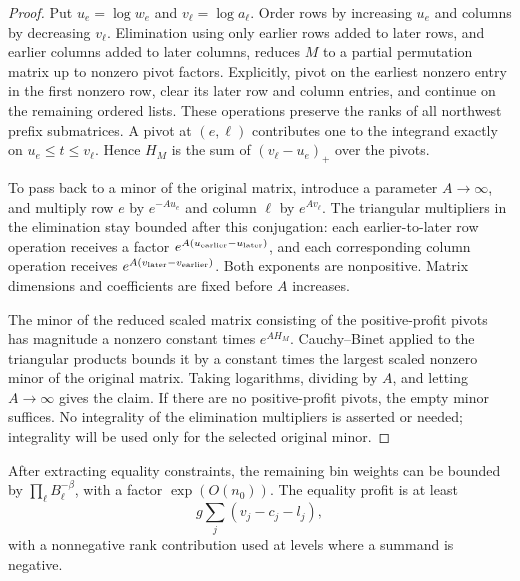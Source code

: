 \begin{proof}
Put $u_e=\log w_e$ and $v_\ell=\log a_\ell$.  Order rows by
increasing $u_e$ and columns by decreasing $v_\ell$.  Elimination
using only earlier rows added to later rows, and earlier columns
added to later columns, reduces $M$ to a partial permutation matrix
up to nonzero pivot factors.  Explicitly, pivot on the earliest
nonzero entry in the first nonzero row, clear its later row and
column entries, and continue on the remaining ordered lists.
These operations preserve the ranks of all northwest prefix
submatrices.  A pivot at $(e,\ell)$ contributes one to the
integrand exactly on $u_e\le t\le v_\ell$.  Hence $H_M$
is the sum of $(v_\ell-u_e)_+$ over the pivots.

To pass back to a minor of the original matrix, introduce a parameter
$A\to\infty$, and multiply row $e$ by $e^{-Au_e}$ and
column $\ell$ by $e^{Av_\ell}$.  The triangular multipliers
in the elimination stay bounded after this conjugation: each
earlier-to-later row operation receives a factor
$e^{A(u_{\rm earlier}-u_{\rm later})}$, and each corresponding
column operation receives
$e^{A(v_{\rm later}-v_{\rm earlier})}$.  Both exponents are
nonpositive.  Matrix dimensions and coefficients are fixed before
$A$ increases.

The minor of the reduced scaled matrix consisting of the
positive-profit pivots has magnitude a nonzero constant times
$e^{AH_M}$.  Cauchy--Binet applied to the triangular products
bounds it by a constant times the largest scaled nonzero minor of
the original matrix.  Taking logarithms, dividing by $A$, and
letting $A\to\infty$ gives the claim.  If there are no
positive-profit pivots, the empty minor suffices.  No integrality
of the elimination multipliers is asserted or needed; integrality
will be used only for the selected original minor.
\end{proof}

\begin{proposition}\label{addr:equality-smoothing}
After extracting equality constraints, the remaining bin weights
can be bounded by $\prod_\ell B_\ell^{-\beta}$, with a
factor $\exp(O(n_0))$.  The equality profit is at least
\begin{equation}\label{eq:original-25}
                           g\sum_j(v_j-c_j-l_j),
\end{equation}
with a nonnegative rank contribution used at levels where a summand
is negative.
\end{proposition}

